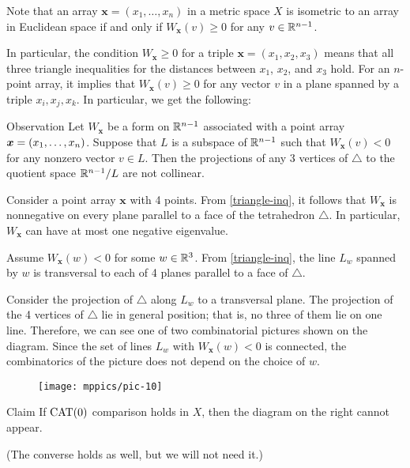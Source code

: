 \documentclass{article}
\begin{document}
Note that an array $\bm{x}=(x_1,\dots,x_n)$ in a metric space $X$ is isometric to an array in Euclidean space if and only if 
$W_{\bm{x}}(v)\ge 0$
for any $v\in \mathbb{R}^{n-1}$.

In particular, the condition $W_{\bm{x}}\ge 0$ for a triple $\bm{x}=(x_1,x_2,x_3)$ means that 
all three triangle inequalities for the distances between $x_1$, $x_2$, and $x_3$ hold.
For an $n$-point array, it implies that $W_{\bm{x}}(v)\ge 0$ for any vector $v$ in a plane spanned by a triple $x_i,x_j,x_k$.
In particular, we get the following:

\begin{thm}{Observation}\label{triangle-inq}
Let $W_{\bm{x}}$ be a form on $\mathbb{R}^{n-1}$ associated with a point array $\bm{x}\z=(x_1,\dots,x_n)$.
Suppose that $L$ is a subspace of $\mathbb{R}^{n-1}$ such that
$W_{\bm{x}}(v)< 0$ for any nonzero vector $v\in L$.
Then the projections of any 3 vertices of $\triangle$ to the quotient space $\mathbb{R}^{n-1}/L$ are not collinear.
\end{thm}

Consider a point array $\bm{x}$ with 4 points.
From \ref{triangle-inq}, 
it follows that $W_{\bm{x}}$ 
is nonnegative on every plane parallel to a face of the tetrahedron $\triangle$.
In particular, $W_{\bm{x}}$ can have at most one negative eigenvalue.

Assume $W_{\bm{x}}(w)<0$ for some $w\in\mathbb{R}^3$.
From \ref{triangle-inq}, the line $L_w$ spanned by
$w$ is transversal to each of 4 planes parallel to a face of $\triangle$.

Consider the projection of $\triangle$ along $L_w$ to a transversal plane. 
The projection of the 4 vertices of $\triangle$ lie in general position; 
that is, no three of them lie on one line.
Therefore, we can see one of two combinatorial pictures shown on the diagram.
Since the set of lines $L_w$ with $W_{\bm{x}}(w)<0$ is connected,
the combinatorics of the picture does not depend on the choice of $w$.

{

\begin{wrapfigure}{r}{33mm}
\vskip-0mm
\centering
\texttt{[image: mppics/pic-10]}
\end{wrapfigure}

\begin{thm}{Claim}
If $\mathrm{CAT}(0)$ comparison holds in $X$, then the diagram on the right cannot appear. 
\end{thm}

(The converse holds as well, but we will not need it.)

}
\end{document}
